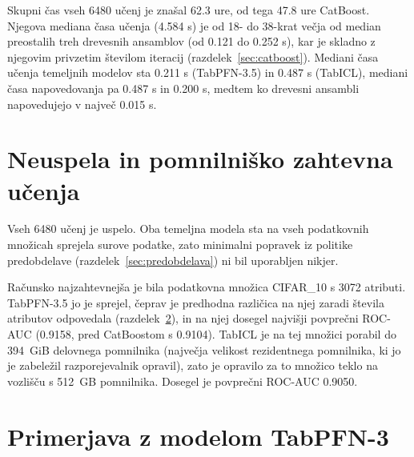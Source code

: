 \documentclass[a4paper,12pt,openright]{book}
\begin{document}


Skupni čas vseh 6480 učenj je znašal \num{62.3} ure, od tega \num{47.8} ure
CatBoost. Njegova mediana časa učenja (\num{4.584} s) je od 18- do 38-krat
večja od median preostalih treh drevesnih ansamblov (od \num{0.121} do
\num{0.252} s), kar je skladno z njegovim privzetim številom iteracij
(razdelek~\ref{sec:catboost}). Mediani časa učenja temeljnih modelov sta
\num{0.211} s (TabPFN-3.5) in \num{0.487} s (TabICL), mediani časa
napovedovanja pa \num{0.487} s in \num{0.200} s, medtem ko drevesni ansambli
napovedujejo v največ \num{0.015} s.

\section{Neuspela in pomnilniško zahtevna učenja}
\label{sec:rez-pomnilnik}

Vseh 6480 učenj je uspelo. Oba temeljna modela sta na vseh podatkovnih množicah
sprejela surove podatke, zato minimalni popravek iz politike predobdelave
(razdelek~\ref{sec:predobdelava}) ni bil uporabljen nikjer.

Računsko najzahtevnejša je bila podatkovna množica CIFAR\_10 s 3072 atributi.
TabPFN-3.5 jo je sprejel, čeprav je predhodna različica na njej zaradi števila
atributov odpovedala (razdelek~\ref{sec:rez-zagona}), in na njej dosegel
najvišji povprečni ROC-AUC (\num{0.9158}, pred CatBoostom s \num{0.9104}).
TabICL je na tej množici porabil do 394~GiB delovnega pomnilnika (največja
velikost rezidentnega pomnilnika, ki jo je zabeležil razporejevalnik opravil),
zato je opravilo za to množico teklo na vozlišču s 512~GB pomnilnika. Dosegel
je povprečni ROC-AUC \num{0.9050}.

\section{Primerjava z modelom TabPFN-3}
\label{sec:rez-zagona}
\end{document}
